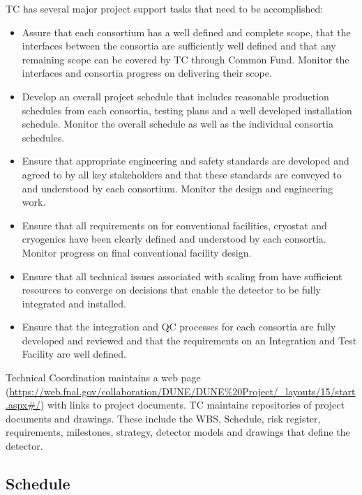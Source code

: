 TC has several major project support tasks that need to be accomplished:
\begin{itemize}
  \item Assure that each consortium has a well defined and complete
    scope, that the interfaces between the consortia are sufficiently
    well defined and that any remaining scope can be covered by TC
    through Common Fund. Monitor the interfaces and consortia progress
    on delivering their scope.
  \item Develop an overall project schedule that includes reasonable
    production schedules from each consortia, testing plans and a well
    developed installation schedule. Monitor the overall schedule as
    well as the individual consortia schedules.
  \item Ensure that appropriate engineering and safety standards are
    developed and agreed to by all key stakeholders and that these
    standards are conveyed to and understood by each
    consortium. Monitor the design and engineering work.
  \item Ensure that all  requirements on  for
    conventional facilities, cryostat and cryogenics have been clearly
    defined and understood by each consortia. Monitor 
    progress on final conventional facility design.
  \item Ensure that all technical issues associated with scaling from
     have sufficient resources to converge on
    decisions that enable the detector to be fully integrated and
    installed.
  \item Ensure that the integration and QC processes for each
    consortia are fully developed and reviewed and that the
    requirements on an Integration and Test Facility are well defined.
\end{itemize}

Technical Coordination maintains a web page
(\url{https://web.fnal.gov/collaboration/DUNE/DUNE\%20Project/\_layouts/15/start.aspx\#/})
with links to project documents. TC maintains repositories of project
documents and drawings. These include the WBS, Schedule, risk
register, requirements, milestones, strategy, detector models and
drawings that define the  detector.


\subsection{Schedule}
\label{sec:fdsp-coord-controls}

